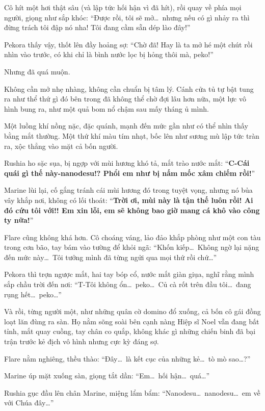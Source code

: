 \documentclass[../main.tex]{subfiles}
\begin{document}
Cô hít một hơi thật sâu (và lập tức hối hận vì đã hít), rồi quay về phía mọi người, giọng như sắp khóc: ``Được rồi, tôi sẽ mở\dots\ nhưng nếu có gì nhảy ra thì đừng trách tôi đập nó nha! Tôi đang cầm sẵn dép lào đây!''

Pekora thấy vậy, thốt lên đầy hoảng sợ: ``Chờ đã! Hay là ta mở hé một chút rồi nhìn vào trước, có khi chỉ là bình nước lọc bị hỏng thôi mà, peko!''

Nhưng đã quá muộn.

Không cần mở nhẹ nhàng, không cần chuẩn bị tâm lý. Cánh cửa tủ tự bật tung ra như thể thứ gì đó bên trong đã không thể chờ đợi lâu hơn nữa, một lực vô hình bung ra, như một quả bom nổ chậm sau mấy tháng ủ mình.

Một luồng khí nồng nặc, đặc quánh, mạnh đến mức gần như có thể nhìn thấy bằng mắt thường. Một thứ khí màu tím nhạt, bốc lên như sương mù lập tức tràn ra, xộc thẳng vào mặt cả bốn người.

Rushia ho sặc sụa, bị ngợp với mùi hương khó tả, mắt trào nước mắt: ``\textbf{C-Cái quái gì thế này-nanodesu!? Phổi em như bị nấm mốc xâm chiếm rồi!}''

Marine lùi lại, cố gắng tránh cái mùi hương đó trong tuyệt vọng, nhưng nó bủa vây khắp nơi, không có lối thoát: ``\textbf{Trời ơi, mùi này là tận thế luôn rồi! Ai đó cứu tôi với!! Em xin lỗi, em sẽ không bao giờ mang cá khô vào công ty nữa!}''

Flare cũng không khá hơn. Cô choáng váng, lảo đảo khắp phòng như một con tàu trong cơn bão, tay bám vào tường để khỏi ngã: ``Khốn kiếp\dots\ Không ngờ lại nặng đến mức này\dots\ Tôi tưởng mình đã từng ngửi qua mọi thứ rồi chứ\dots''

Pekora thì trợn ngược mắt, hai tay bóp cổ, nước mắt giàn giụa, nghĩ rằng mình sắp chầu trời đến nơi: ``T-Tôi không ổn\dots\ peko\dots\ Củ cà rốt trên đầu tôi\dots\ đang rụng hết\dots\ peko\dots''

Và rồi, từng người một, như những quân cờ domino đổ xuống, cả bốn cô gái đồng loạt lăn đùng ra sàn. Họ nằm sõng soài bên cạnh nàng Hiệp sĩ Noel vẫn đang bất tỉnh, mắt quay cuồng, tay chân co quắp, không khác gì những chiến binh đã bại trận trước kẻ địch vô hình nhưng cực kỳ đáng sợ.

Flare nằm nghiêng, thều thào: ``Đây\dots\ là kết cục của những kẻ\dots\ tò mò sao\dots?''

Marine úp mặt xuống sàn, giọng tắt dần: ``Em\dots\ hối hận\dots\ quá\dots''

Rushia gục đầu lên chân Marine, miệng lẩm bẩm: ``Nanodesu\dots\ nanodesu\dots\ em về với Chúa đây\dots''
\end{document}
